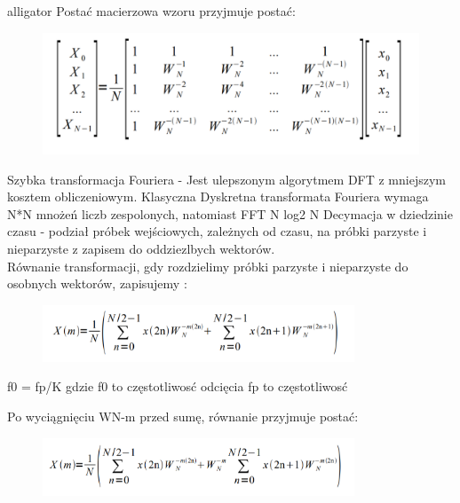 \documentclass[12pt]{article}
\begin{document}
\begin{labeling}{alligator}
Postać macierzowa wzoru przyjmuje postać:
\begin{figure}[h!]
 \centering
 \includegraphics[width=12.3cm]{PMAcierzowa.PNG}
 \vspace{-0.3cm}
 \label{Splot_indeks}
\end{figure}

\item [Szybka transformacja Fouriera]  - Jest ulepszonym algorytmem DFT z mniejszym kosztem obliczeniowym. Klasyczna Dyskretna transformata Fouriera wymaga N*N mnożeń liczb zespolonych, natomiast FFT N log2 N
\subitem Decymacja w dziedzinie czasu - podział próbek wejściowych, zależnych od czasu, na próbki parzyste i nieparzyste z zapisem do oddziezlbych wektorów.
\\Równanie transformacji, gdy rozdzielimy próbki parzyste i nieparzyste do osobnych wektorów, zapisujemy :

\begin{figure}[h!]
 \centering
 \includegraphics[width=9.3cm]{Decy.PNG}
 \vspace{-0.3cm}
 \label{filtrS}
\end{figure}
\subsubitem f0 = fp/K gdzie f0 to częstotliwosć odcięcia
\subsubitem fp to częstotliwosć 

Po wyciągnięciu WN-m przed sumę, równanie przyjmuje postać:

\begin{figure}[h!]
 \centering
 \includegraphics[width=9.3cm]{DecyW.PNG}
 \vspace{-0.3cm}
 \label{filtrS}
\end{figure}


\end{labeling}
\end{document}
